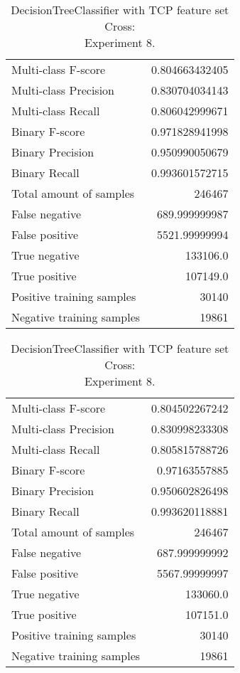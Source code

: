\begin{table}[H]
\begin{minipage}{0.5\textwidth}
\caption{DecisionTreeClassifier with TCP feature set Cross: \\Experiment 7.}
\centering
\begin{tabular}{l r}
\toprule
Multi-class F-score & 0.804663432405 \\
Multi-class Precision & 0.830704034143 \\
Multi-class Recall & 0.806042999671 \\
\midrule
Binary F-score & 0.971828941998 \\
Binary Precision & 0.950990050679 \\
Binary Recall & 0.993601572715 \\
\midrule
Total amount of samples & 246467 \\
False negative & 689.999999987 \\
False positive & 5521.99999994 \\
True negative & 133106.0 \\
True positive & 107149.0 \\
\midrule
Positive training samples & 30140 \\
Negative training samples & 19861 \\
\bottomrule
\end{tabular}
\end{minipage}
\hfillx
\begin{minipage}{0.5\textwidth}
\caption{DecisionTreeClassifier with TCP feature set Cross: \\Experiment 8.}
\centering
\begin{tabular}{l r}
\toprule
Multi-class F-score & 0.804502267242 \\
Multi-class Precision & 0.830998233308 \\
Multi-class Recall & 0.805815788726 \\
\midrule
Binary F-score & 0.97163557885 \\
Binary Precision & 0.950602826498 \\
Binary Recall & 0.993620118881 \\
\midrule
Total amount of samples & 246467 \\
False negative & 687.999999992 \\
False positive & 5567.99999997 \\
True negative & 133060.0 \\
True positive & 107151.0 \\
\midrule
Positive training samples & 30140 \\
Negative training samples & 19861 \\
\bottomrule
\end{tabular}
\end{minipage}
\end{table}
